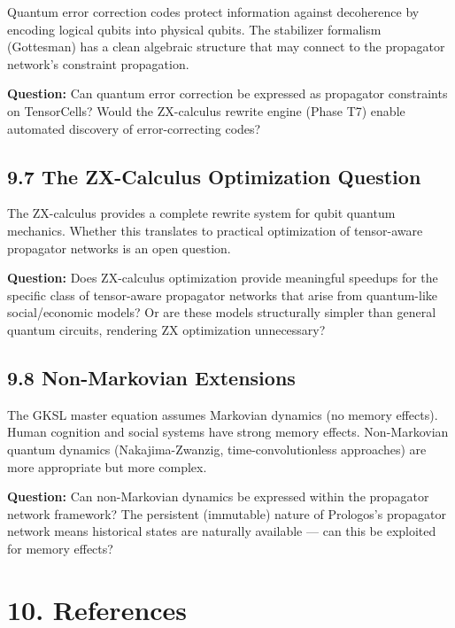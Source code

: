 \documentclass[11pt]{article}
\begin{document}
Quantum error correction codes protect information against decoherence by
encoding logical qubits into physical qubits. The stabilizer formalism
(Gottesman) has a clean algebraic structure that may connect to the propagator
network's constraint propagation.

\textbf{Question:} Can quantum error correction be expressed as propagator constraints
on TensorCells? Would the ZX-calculus rewrite engine (Phase T7) enable
automated discovery of error-correcting codes?
\subsection{9.7 The ZX-Calculus Optimization Question}
\label{sec:org5d8f3eb}

The ZX-calculus provides a complete rewrite system for qubit quantum mechanics.
Whether this translates to practical optimization of tensor-aware propagator
networks is an open question.

\textbf{Question:} Does ZX-calculus optimization provide meaningful speedups for the
specific class of tensor-aware propagator networks that arise from quantum-like
social/economic models? Or are these models structurally simpler than general
quantum circuits, rendering ZX optimization unnecessary?
\subsection{9.8 Non-Markovian Extensions}
\label{sec:org99090b4}

The GKSL master equation assumes Markovian dynamics (no memory effects). Human
cognition and social systems have strong memory effects. Non-Markovian quantum
dynamics (Nakajima-Zwanzig, time-convolutionless approaches) are more appropriate
but more complex.

\textbf{Question:} Can non-Markovian dynamics be expressed within the propagator network
framework? The persistent (immutable) nature of Prologos's propagator network
means historical states are naturally available --- can this be exploited for
memory effects?
\section{10. References}
\label{sec:orgb7aa55c}
\end{document}
